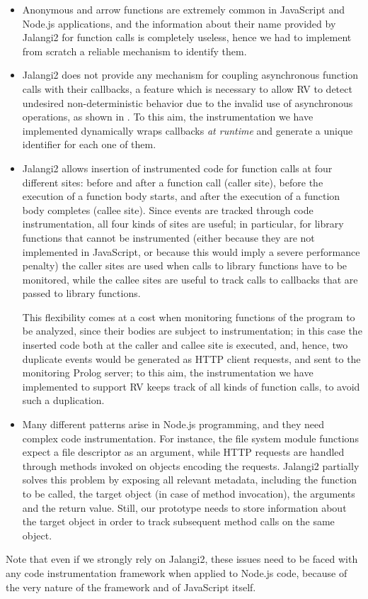 \begin{itemize}
\item Anonymous and arrow functions are extremely common in JavaScript and Node.js applications, and the information about their name
  provided by Jalangi2 for function calls is completely  useless, hence we had to implement from scratch a reliable mechanism to identify them.
\item Jalangi2 does not provide any mechanism for coupling asynchronous function calls with their callbacks, a feature which is
  necessary to allow RV to detect undesired non-deterministic behavior due to the invalid use of asynchronous operations, as shown in
  . %
To this aim, the instrumentation we have implemented dynamically wraps callbacks \emph{at runtime} and generate a unique identifier for each one of them.
\item Jalangi2 allows insertion of instrumented code for function calls at four different sites: before and after a function call (caller site), 
  before the execution of a function body starts, and after the execution of a function body completes (callee site). Since
  events are tracked through code instrumentation, all four kinds of sites are useful; in particular, for library functions that cannot be
  instrumented (either because they are not implemented in JavaScript, or because this would imply a severe performance penalty)  the caller sites
  are used when calls to library functions have to be monitored, while the callee sites are useful to track calls to callbacks that are passed to
  library functions.

  This flexibility comes at a cost when monitoring functions of the program to be analyzed, since their bodies are subject to instrumentation; in this case the inserted code both at the caller and callee site is executed, and, hence, two duplicate events would be generated as HTTP client requests, and sent to the monitoring Prolog server; to this aim,
  the instrumentation we have implemented to support RV keeps track of all kinds of function calls, to avoid such a duplication.
\item Many different patterns arise in Node.js programming, and they need complex code instrumentation.
For instance, the file system module functions expect a file descriptor as an argument, while HTTP requests are handled through methods invoked on objects encoding the requests.
Jalangi2 partially solves this problem by exposing all relevant metadata, including the function to be called, the target object (in case of method invocation), the arguments and the return value.
Still, our prototype needs to store information about the target object in order to track subsequent method calls on the same object.
\end{itemize}
Note that even if we strongly rely on Jalangi2, these issues need to be faced with any code instrumentation framework when applied to Node.js code, because of the very nature of the framework and of JavaScript itself.

